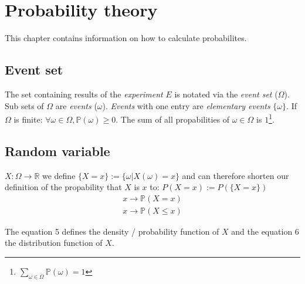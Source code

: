 \documentclass[twoside, a4paper, twocolumn]{article}
\begin{document}
    \section{Probability theory}
    This chapter contains information on how to calculate probabilites.

    \subsection{Event set}
    The set containing results of the \textit{experiment} $E$ is notated via
    the \textit{event set} ($\Omega$). Sub sets of $\Omega$ are
    \textit{events} ($\omega$). \textit{Events} with one entry are \textit{elementary
    events} $\{\omega\}$.
    If $\Omega$ is finite: $\forall \omega \in \Omega,\mathbb{P}(\omega) \geq 0$. 
    The sum of all propabilities of $\omega \in \Omega$ is $1$\footnote{$\sum_{\omega
    \in \Omega} \mathbb{P}(\omega) = 1$}.

    \subsection{Random variable}
    $X: \Omega \rightarrow \mathbb{R}$ we define $\{X = x\} := \{\omega |
    X(\omega) = x\}$ and can therefore shorten our definition of the
    propability that $X$ is $x$ to: $P(X = x) := P(\{X = x\})$
    \begin{eqnarray}
        x \rightarrow \mathbb{P}(X = x) \\
        x \rightarrow \mathbb{P}(X \leq x)
    \end{eqnarray}

    The equation 5 defines the density / probability function of $X$ and the
    equation 6 the distribution function of $X$.
\end{document}
